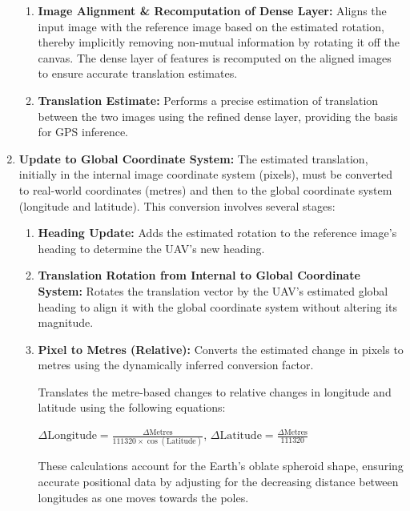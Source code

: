 \begin{enumerate}
\begin{enumerate}
        \item \textbf{Image Alignment \& Recomputation of Dense Layer:}  
        Aligns the input image with the reference image based on the estimated rotation, thereby implicitly removing non-mutual information by rotating it off the canvas. The dense layer of features is recomputed on the aligned images to ensure accurate translation estimates.
        
        \item \textbf{Translation Estimate:}  
        Performs a precise estimation of translation between the two images using the refined dense layer, providing the basis for GPS inference.
    \end{enumerate}

    \item \textbf{Update to Global Coordinate System:}  
    The estimated translation, initially in the internal image coordinate system (pixels), must be converted to real-world coordinates (metres) and then to the global coordinate system (longitude and latitude). This conversion involves several stages:
    \begin{enumerate}
        \item \textbf{Heading Update:}  
        Adds the estimated rotation to the reference image's heading to determine the UAV's new heading.
        
        \item \textbf{Translation Rotation from Internal to Global Coordinate System:}  
        Rotates the translation vector by the UAV's estimated global heading to align it with the global coordinate system without altering its magnitude.
        
        \item \textbf{Pixel to Metres (Relative):}  
        Converts the estimated change in pixels to metres using the dynamically inferred conversion factor. 
        
        Translates the metre-based changes to relative changes in longitude and latitude using the following equations: 

        \(\Delta \text{Longitude} = \frac{\Delta \text{Metres}}{111320 \times \cos(\text{Latitude})}\), \(\Delta \text{Latitude} = \frac{\Delta \text{Metres}}{111320}\)

        These calculations account for the Earth's oblate spheroid shape, ensuring accurate positional data by adjusting for the decreasing distance between longitudes as one moves towards the poles.
        

\end{enumerate}
\end{enumerate}
